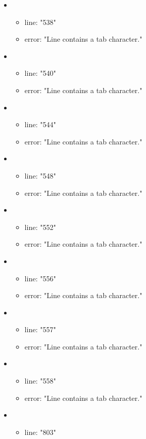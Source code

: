 \begin{itemize}
	\item 
	\begin{itemize} 
		\item line: "538" 
		\item error: "Line contains a tab character." 
	\end{itemize}
	\item 
	\begin{itemize} 
		\item line: "540" 
		\item error: "Line contains a tab character." 
	\end{itemize}
	\item 
	\begin{itemize} 
		\item line: "544" 
		\item error: "Line contains a tab character." 
	\end{itemize}
	\item 
	\begin{itemize} 
		\item line: "548" 
		\item error: "Line contains a tab character." 
	\end{itemize}
	\item 
	\begin{itemize} 
		\item line: "552" 
		\item error: "Line contains a tab character." 
	\end{itemize}
	\item 
	\begin{itemize} 
		\item line: "556" 
		\item error: "Line contains a tab character." 
	\end{itemize}
	\item 
	\begin{itemize} 
		\item line: "557" 
		\item error: "Line contains a tab character." 
	\end{itemize}
	\item 
	\begin{itemize} 
		\item line: "558" 
		\item error: "Line contains a tab character." 
	\end{itemize}
	\item 
	\begin{itemize} 
		\item line: "803" 

\end{itemize}
\end{itemize}
